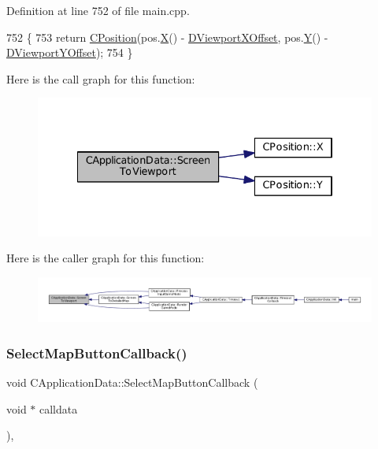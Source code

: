 Definition at line 752 of file main.\+cpp.


\begin{DoxyCode}
752                                                                 \{
753     \textcolor{keywordflow}{return} \hyperlink{classCPosition}{CPosition}(pos.\hyperlink{classCPosition_a9a6b94d3b91df1492d166d9964c865fc}{X}() - \hyperlink{classCApplicationData_a306bba873ccc47126111305fe21ef3ff}{DViewportXOffset}, pos.\hyperlink{classCPosition_a1aa8a30e2f08dda1f797736ba8c13a87}{Y}() - 
      \hyperlink{classCApplicationData_afc58ed96a1af813b28f6abf2c7d2dc72}{DViewportYOffset});
754 \}
\end{DoxyCode}
Here is the call graph for this function\+:
\nopagebreak
\begin{figure}[H]
\begin{center}
\leavevmode
\includegraphics[width=334pt]{classCApplicationData_aebd3ae4cfd74962413024f1649233f08_cgraph}
\end{center}
\end{figure}
Here is the caller graph for this function\+:
\nopagebreak
\begin{figure}[H]
\begin{center}
\leavevmode
\includegraphics[width=350pt]{classCApplicationData_aebd3ae4cfd74962413024f1649233f08_icgraph}
\end{center}
\end{figure}
\hypertarget{classCApplicationData_a5f915dc03205b67ca79f4dcfd7b43f5a}{}\label{classCApplicationData_a5f915dc03205b67ca79f4dcfd7b43f5a} 
\subsubsection{\texorpdfstring{Select\+Map\+Button\+Callback()}{SelectMapButtonCallback()}}
{\footnotesize\ttfamily void C\+Application\+Data\+::\+Select\+Map\+Button\+Callback (\begin{DoxyParamCaption}\item[{void $\ast$}]{calldata }\end{DoxyParamCaption})\hspace{0.3cm}{\ttfamily [static]}, {\ttfamily [protected]}}



